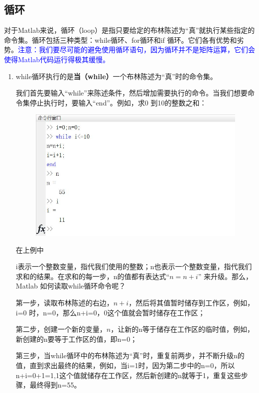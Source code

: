 \documentclass[10pt,math=newtx,citestyle=gb7714-2015,bibstyle=gb7714-2015]{elegantbook}
\begin{document}
{{{	\subsection{循环}
	
	对于Matlab来说，循环（loop）是指只要给定的布林陈述为“真”就执行某些指定的命令集。循环包括三种类型：while循环、for循环和if 循环。它们各有优势和劣势。\textcolor{blue}{注意：我们要尽可能的避免使用循环语句，因为循环并不是矩阵运算，它们会使得Matlab代码运行得极其缓慢。}
	
	\begin{enumerate}
		\item while循环执行的是\textbf{当（while）}一个布林陈述为“真”时的命令集。
		
		我们首先要输入“while”来陈述条件，然后增加需要执行的命令。当我们想要命令集停止执行时，要输入“end”。例如，求0 到10的整数之和：
		
		\begin{figure}[htbp!]
			\centering
			\includegraphics[width=0.8\linewidth]{FIG/integersum}
			\centering
		\end{figure}
		
		在上例中
		
		i表示一个整数变量，指代我们使用的整数；n也表示一个整数变量，指代我们求和的结果。在求和的每一步，n的值都有表达式“$n=n+i$” 来升级。那么，Matlab 如何读取while循环命令呢？
		
		第一步，读取布林陈述的右边，$n+i$，然后将其值暂时储存到工作区，例如，i=0 时，n=0，那么n+i=0，0这个值就会暂时储存在工作区；
		
		第二步，创建一个新的变量，$n$，让新的n等于储存在工作区的临时值，例如，新创建的n要等于工作区的值，即n=0；
		
		第三步，当while循环中的布林陈述为“真”时，重复前两步，并不断升级n的值，直到求出最终的结果，例如，当i=1时，因为第二步中的n=0，所以n+i=0+1=1,1这个值就储存在工作区，然后新创建的n就等于1，重复这些步骤，最终得到n=55。
		

\end{enumerate}}}}
\end{document}
